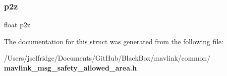 \mbox{\label{struct____mavlink__safety__allowed__area__t_aac97c3f533379eeb12d91bf8bd1eb3f6}} 
\subsubsection{p2z}
{\footnotesize\ttfamily float p2z}



The documentation for this struct was generated from the following file\+:\begin{DoxyCompactItemize}
\item 
/\+Users/jselfridge/\+Documents/\+Git\+Hub/\+Black\+Box/mavlink/common/\textbf{ mavlink\+\_\+msg\+\_\+safety\+\_\+allowed\+\_\+area.\+h}\end{DoxyCompactItemize}
